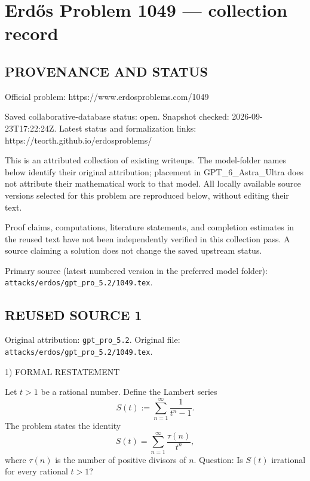 \section*{Erd\H{o}s Problem 1049 --- collection record}

\subsection*{PROVENANCE AND STATUS}
Official problem: https://www.erdosproblems.com/1049

Saved collaborative-database status: open.
Snapshot checked: 2026-09-23T17:22:24Z.
Latest status and formalization links: https://teorth.github.io/erdosproblems/

This is an attributed collection of existing writeups. The model-folder names below identify their original attribution; placement in GPT\_6\_Astra\_Ultra does not attribute their mathematical work to that model. All locally available source versions selected for this problem are reproduced below, without editing their text.

Proof claims, computations, literature statements, and completion estimates in the reused text have not been independently verified in this collection pass. A source claiming a solution does not change the saved upstream status.

Primary source (latest numbered version in the preferred model folder): \texttt{attacks/erdos/gpt\_pro\_5.2/1049.tex}.

\subsection*{REUSED SOURCE 1}
Original attribution: \texttt{gpt\_pro\_5.2}.
Original file: \texttt{attacks/erdos/gpt\_pro\_5.2/1049.tex}.


1) FORMAL RESTATEMENT

Let $t>1$ be a rational number.
Define the Lambert series
\[
  S(t):=\sum_{n=1}^\infty \frac{1}{t^n-1}.
\]
The problem states the identity
\[
  S(t)=\sum_{n=1}^\infty \frac{\tau(n)}{t^n},
\]
where $\tau(n)$ is the number of positive divisors of $n$.
Question: Is $S(t)$ irrational for every rational $t>1$?

